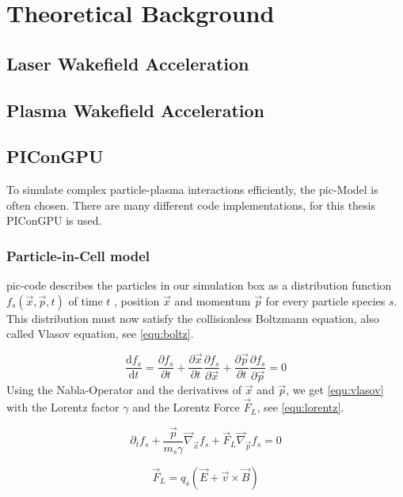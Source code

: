 \documentclass[bachelor_thesis]{subfiles}
\begin{document}
\chapter{Theoretical Background}
\section{Laser Wakefield Acceleration}
\section{Plasma Wakefield Acceleration}

\section{PIConGPU}
To simulate complex particle-plasma interactions efficiently, the \gls{pic}-Model is often chosen. There are many different code implementations, for this thesis PIConGPU \cite{PIConGPU2013, PICRepo} is used.

\subsection{Particle-in-Cell model}
\Gls{pic}-code describes the particles in our simulation box as a distribution function $f_s(\vec{x}, \vec{p}, t)$ of time $t$ , position $\vec{x}$ and momentum $\vec{p}$ for every particle species $s$.
This distribution must now satisfy the collisionless Boltzmann equation, also called Vlasov equation\cite{Vlasov1968}, see \autoref{equ:boltz}.

\begin{equation}
	\frac{\mathrm{d}f_s}{\mathrm{d}t}=\frac{\partial f_s}{\partial t} + \frac{\partial \vec{x}}{\partial t} \frac{\partial f_s}{\partial \vec{x}} + \frac{\partial \vec{p}}{\partial t} \frac{\partial f_s}{\partial \vec{p}} = 0
	\label{equ:boltz}
\end{equation}
Using the Nabla-Operator and the derivatives of $\vec{x}$ and $\vec{p}$, we get \autoref{equ:vlasov} with the Lorentz factor $\gamma$ and the Lorentz Force $\vec{F}_L$, see \autoref{equ:lorentz}.

\begin{equation}
	\partial_t f_s + \frac{\vec{p}}{m_s \gamma} \vec{\nabla}_{\vec{x}} f_s + \vec{F}_L \vec{\nabla}_{\vec{p}} f_s = 0
	\label{equ:vlasov}
\end{equation}

\begin{equation}
	\vec{F}_L=q_s\left(\vec{E}+\vec{v}\times\vec{B}\right)
	\label{equ:lorentz}
\end{equation}
\end{document}

